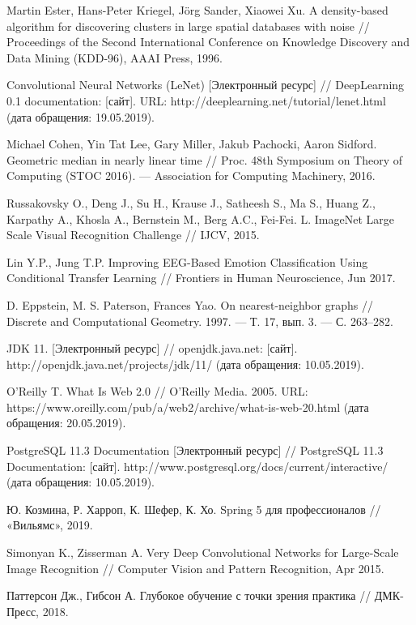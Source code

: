\begingroup 
\renewcommand{\section}[2]{\anonsection{Библиографический список}}
\begin{thebibliography}{00}

    Martin Ester, Hans-Peter Kriegel, Jörg Sander, Xiaowei Xu.
    A density-based algorithm for discovering clusters in large spatial databases with noise // 
    Proceedings of the Second International Conference on Knowledge Discovery and Data Mining (KDD-96),
    AAAI Press, 
    1996.

    Convolutional Neural Networks (LeNet) 
    [Электронный ресурс] // 
    DeepLearning 0.1 documentation: [сайт]. 
    URL: http://deeplearning.net/tutorial/lenet.html 
    (дата обращения: 19.05.2019).

    Michael Cohen, Yin Tat Lee, Gary Miller, Jakub Pachocki, Aaron Sidford. 
    Geometric median in nearly linear time // 
    Proc. 48th Symposium on Theory of Computing (STOC 2016). — Association for Computing Machinery, 
    2016.

    Russakovsky O., Deng J., Su H., Krause J., Satheesh S., Ma S., Huang Z., Karpathy A., Khosla A., Bernstein M., Berg A.C., Fei-Fei. L. 
    ImageNet Large Scale Visual Recognition Challenge // 
    IJCV, 
    2015.

    Lin Y.P., Jung T.P.
    Improving EEG-Based Emotion Classification Using Conditional Transfer Learning //
    Frontiers in Human Neuroscience, 
    Jun 2017.

    D. Eppstein, M. S. Paterson, Frances Yao. 
    On nearest-neighbor graphs // 
    Discrete and Computational Geometry. 
    1997. — Т. 17, вып. 3. — С. 263–282.

    JDK 11.
    [Электронный ресурс] // 
    openjdk.java.net: [сайт]. 
    http://openjdk.java.net/projects/jdk/11/
    (дата обращения: 10.05.2019).

    O'Reilly T. What Is Web 2.0 // 
    O’Reilly Media. 
    2005. 
    URL: https://www.oreilly.com/pub/a/web2/archive/what-is-web-20.html 
    (дата обращения: 20.05.2019).

    PostgreSQL 11.3 Documentation
    [Электронный ресурс] // 
    PostgreSQL 11.3 Documentation: [сайт]. 
    http://www.postgresql.org/docs/current/interactive/
    (дата обращения: 10.05.2019).

    Ю. Козмина, Р. Харроп, К. Шефер, К. Хо. 
    Spring 5 для профессионалов //
    «Вильямс», 
    2019.

    Simonyan K., Zisserman A. 
    Very Deep Convolutional Networks for Large-Scale Image Recognition // 
    Computer Vision and Pattern Recognition, 
    Apr 2015.

    Паттерсон Дж., Гибсон А. 
    Глубокое обучение с точки зрения практика //
    ДМК-Пресс, 
    2018.

\end{thebibliography}
\endgroup

\clearpage